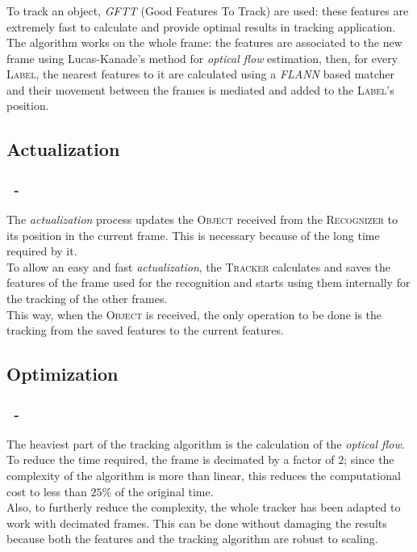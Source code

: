 \documentclass{beamer}
\begin{document}
	\begin{frame}
		\frametitle{\insertsection}
		To track an object, \emph{GFTT} (Good Features To Track) are used:
		these features are extremely fast to calculate and provide optimal results
		in tracking application.\\
		The algorithm works on the whole frame: the features are associated to the
		new frame using Lucas-Kanade's method for \emph{optical flow} estimation,
		then, for every \textsc{Label}, the nearest features to it are calculated
		using a \emph{FLANN} based matcher and their movement between the frames is
		mediated and added to the \textsc{Label}'s position.
	\end{frame}

	\subsection{Actualization}

	\begin{frame}
		\frametitle{\insertsection\ - \insertsubsection}
		The \emph{actualization} process updates the \textsc{Object} received from
		the \textsc{Recognizer} to its position in the current frame. This is
		necessary because of the long time required by it.\\
		To allow an easy and fast \emph{actualization}, the \textsc{Tracker}
		calculates and saves the features of the frame used for the recognition
		and starts using them internally for the tracking of the other frames.\\
		This way, when the \textsc{Object} is received, the only operation to be
		done is the tracking from the saved features to the current features.\\
	\end{frame}
	
	\subsection{Optimization}

	\begin{frame}
		\frametitle{\insertsection\ - \insertsubsection}
		The heaviest part of the tracking algorithm is the calculation of the \emph{optical
		flow}. To reduce the time required, the frame is decimated by a factor
		of $2$; since the complexity of the algorithm is more than linear, this
		reduces the computational cost to less than $25\%$ of the original time.\\
		Also, to furtherly reduce the complexity, the whole tracker has been
		adapted to work with decimated frames. This can be done without damaging
		the results because both the features and the tracking algorithm are robust
		to scaling.\\
	\end{frame}
\end{document}
